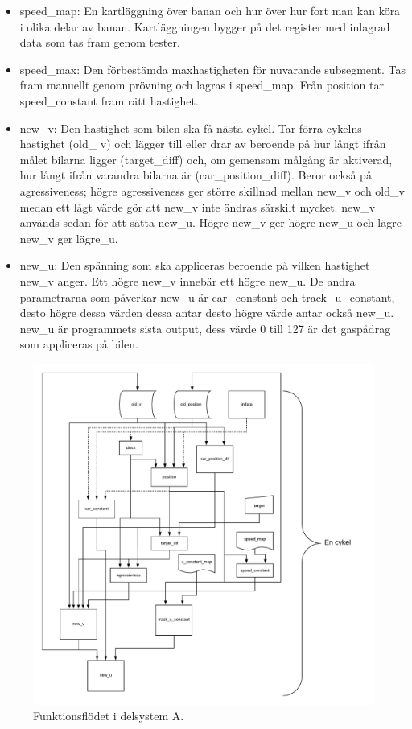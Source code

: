 \begin{itemize}
 \item speed\_map: En kartläggning över banan och hur över hur fort man kan köra i olika delar av banan. Kartläggningen bygger på det register med inlagrad data som tas fram genom tester.

      \item speed\_max: Den förbestämda maxhastigheten för nuvarande subsegment. Tas fram manuellt genom prövning och lagras i speed\_map. Från position tar speed\_constant fram rätt hastighet. 

\item new\_v: Den hastighet som bilen ska få nästa cykel. Tar förra cykelns hastighet (old\_ v) 
och lägger till eller drar av beroende på hur långt ifrån målet bilarna ligger (target\_diff) och, om gemensam
målgång är aktiverad, hur långt ifrån varandra bilarna är (car\_position\_diff). Beror 
också på agressiveness; högre agressiveness ger större skillnad mellan new\_v och old\_v medan ett lågt värde gör att new\_v 
inte ändras särskilt mycket.
new\_v används sedan för att sätta
new\_u. Högre new\_v ger högre new\_u och lägre new\_v ger lägre\_u. 
	
\item new\_u: Den spänning som ska appliceras beroende på vilken hastighet new\_v anger. Ett högre new\_v innebär ett högre new\_u. De andra parametrarna som påverkar new\_u är car\_constant och track\_u\_constant, desto högre dessa värden dessa antar desto högre värde antar också new\_u. new\_u är programmets sista output, dess värde 0 till 127 är det gaspådrag som appliceras på bilen.
    \end{itemize}

    \begin{figure}
      \centering
      \includegraphics[width=\linewidth]{figures/flow.pdf}
      \caption{Funktionsflödet i delsystem A.}%
      \label{fig:flow_diagram}
    \end{figure}

